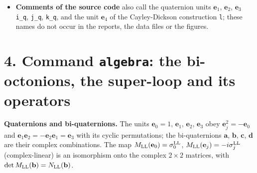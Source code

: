 \documentclass[
  10pt,
]{article}
\begin{document}
\begin{itemize}
  \({\rm Im}\,\mathbb H\), \({\rm Im}\,\mathbb O\) and
  \(\mathbb C\otimes\mathbb H\); the groups and algebras
  (\texttt{SL(2,C)}, \texttt{so(3,1)}, \texttt{g2(C)},
  \texttt{SU(2)\_v}, \texttt{U(1)\_F\_LL}, \texttt{Z2}, \ldots) are
  written as in the text; \texttt{4x4} means four by four; ``exact'' in
  a check means integer or rational arithmetic, ``double precision''
  floating-point arithmetic with 53-bit mantissas.
\item
  \textbf{Comments of the source code} also call the quaternion units
  \(\mathbf e_1\), \(\mathbf e_2\), \(\mathbf e_3\) \texttt{i\_q},
  \texttt{j\_q}, \texttt{k\_q}, and the unit \(\mathbf e_4\) of the
  Cayley-Dickson construction \texttt{l}; these names do not occur in
  the reports, the data files or the figures.
\end{itemize}

\hypertarget{command-algebra-the-bi-octonions-the-super-loop-and-its-operators}{%
\section{\texorpdfstring{4. Command \texttt{algebra}: the bi-octonions,
the super-loop and its
operators}{4. Command algebra: the bi-octonions, the super-loop and its operators}}\label{command-algebra-the-bi-octonions-the-super-loop-and-its-operators}}

\textbf{Quaternions and bi-quaternions.} The units \(\mathbf e_0=1\),
\(\mathbf e_1\), \(\mathbf e_2\), \(\mathbf e_3\) obey
\(\mathbf e_j^2=-\mathbf e_0\) and
\(\mathbf e_1\mathbf e_2=-\mathbf e_2\mathbf e_1=\mathbf e_3\) with its
cyclic permutations; the bi-quaternions \(\mathbf a\), \(\mathbf b\),
\(\mathbf c\), \(\mathbf d\) are their complex combinations. The map
\(M_{\rm LL}(\mathbf e_0)=\sigma^{\rm LL}_0\),
\(M_{\rm LL}(\mathbf e_j)=-i\sigma^{\rm LL}_j\) (complex-linear) is an
isomorphism onto the complex \(2\times2\) matrices, with
\(\det M_{\rm LL}(\mathbf b)=N_{\rm LL}(\mathbf b)\).
\end{document}
